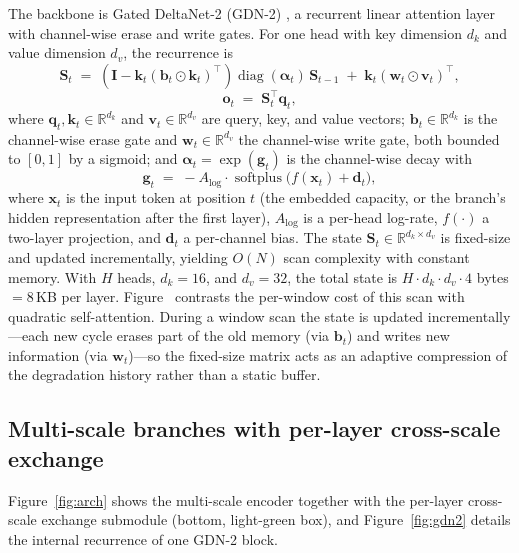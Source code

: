 The backbone is Gated DeltaNet-2 (GDN-2) \cite{ref_gdn2}, a
recurrent linear attention layer with channel-wise erase and write
gates. For one head with key dimension $d_k$ and value dimension
$d_v$, the recurrence is
\begin{equation}
\label{eq:gdn2}
\mathbf{S}_t \;=\; \left( \mathbf{I} - \mathbf{k}_t(\mathbf{b}_t
\odot \mathbf{k}_t)^{\top} \right)
\operatorname{diag}(\boldsymbol{\alpha}_t)\, \mathbf{S}_{t-1}
\;+\; \mathbf{k}_t(\mathbf{w}_t \odot \mathbf{v}_t)^{\top},
\end{equation}
\begin{equation}
\label{eq:readout}
\mathbf{o}_t \;=\; \mathbf{S}_t^{\top}\mathbf{q}_t,
\end{equation}
where $\mathbf{q}_t,\mathbf{k}_t \in \mathbb{R}^{d_k}$ and
$\mathbf{v}_t \in \mathbb{R}^{d_v}$ are query, key, and value vectors;
$\mathbf{b}_t \in \mathbb{R}^{d_k}$ is the channel-wise erase gate and
$\mathbf{w}_t \in \mathbb{R}^{d_v}$ the channel-wise write gate, both
bounded to $[0,1]$ by a sigmoid; and
$\boldsymbol{\alpha}_t = \exp(\mathbf{g}_t)$ is the channel-wise decay
with
\begin{equation}
\mathbf{g}_t \;=\; -A_{\log}\cdot
\operatorname{softplus}\!\big( f(\mathbf{x}_t) + \mathbf{d}_t \big),
\end{equation}
where $\mathbf{x}_t$ is the input token at position $t$ (the embedded
capacity, or the branch's hidden representation after the first
layer), $A_{\log}$ is a per-head log-rate, $f(\cdot)$ a two-layer
projection, and $\mathbf{d}_t$ a per-channel bias. The state
$\mathbf{S}_t \in \mathbb{R}^{d_k \times d_v}$ is fixed-size and
updated incrementally, yielding $O(N)$ scan complexity with
constant memory. With $H$ heads, $d_k=16$, and $d_v=32$, the total
state is $H \cdot d_k \cdot d_v \cdot 4$ bytes $= 8$\,KB per layer.
Figure~ contrasts the per-window cost of this
scan with quadratic self-attention.
During a window scan the state is updated incrementally---each new
cycle erases part of the old memory (via $\mathbf{b}_t$) and writes
new information (via $\mathbf{w}_t$)---so the fixed-size matrix acts
as an adaptive compression of the degradation history rather than a
static buffer.

\subsection{Multi-scale branches with per-layer cross-scale exchange}
\label{sec:multiscale}

Figure~\ref{fig:arch} shows the multi-scale encoder
together with the per-layer cross-scale exchange submodule (bottom,
light-green box), and Figure~\ref{fig:gdn2} details the internal
recurrence of one GDN-2 block.

